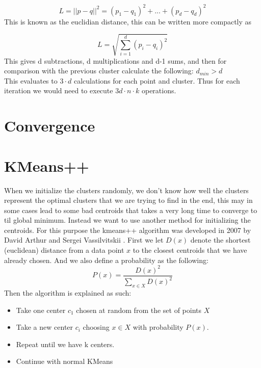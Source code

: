 \documentclass[12pt]{report}
\begin{document}
\begin{equation}
  L = ||p - q||^2 = (p_1 - q_1)^2 +...+(p_d - q_d)^2
\end{equation}
This is known as the euclidian distance, this can be written more compactly as

\begin{equation}
  L = \sqrt{\sum_{i=1}^d(p_i - q_i)^2}
\end{equation}
This gives d subtractions, d multiplications and d-1 sums, and then for comparison with the previous cluster calculate the following: $d_{min} > d$ \\
This evaluates to $3\cdot d$ calculations for each point and cluster. Thus for each iteration we would need to execute $3d \cdot n \cdot k$ operations.

\section{Convergence}
\label{subsec:Convergens}



\section{KMeans++}
When we initialize the clusters randomly, we don't know how well the clusters represent the optimal clusters that we are trying to find in the end, this may in some cases lead to some  bad centroids that takes a very long time to converge to til global minimum. Instead we want to use another method for initializing the centroids. For this purpose the kmeans++ algorithm was developed in 2007 by David Arthur and Sergei Vassilvitskii \cite{plusplus}.
First we let $D(x)$ denote the shortest (euclidean) distance from a data point $x$ to the closest centroids that we have already chosen. And we also define a probability as the following:
\begin{equation}
P(x) = \frac{D(x)^2}{\sum_{x\in X}D(x)^2}
\end{equation}
Then the algorithm is explained as such:
\begin{itemize}
  \item Take one center $c_1$ chosen at random from the set of points $X$
  \item Take a new center $c_i$ choosing $x\in X$ with probability $P(x)$.
  \item Repeat until we have k centers.
  \item Continue with normal KMeans
\end{itemize}
\end{document}
